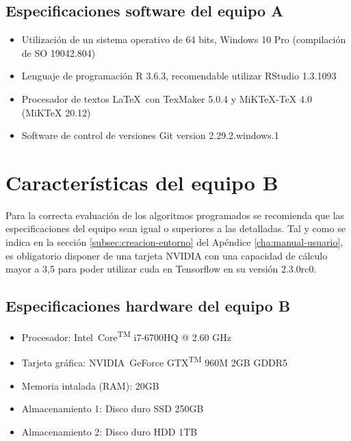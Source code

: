 \subsection{Especificaciones software del equipo A}
\label{subsec:especificaciones-software-equipoa}
\begin{itemize}
    \item Utilización de un sistema operativo de 64 bits, Windows 10 Pro (compilación de SO 19042.804)
    \item Lenguaje de programación R 3.6.3, recomendable utilizar RStudio 1.3.1093
    \item Procesador de textos \LaTeX\ con TexMaker 5.0.4 y MiKTeX-TeX 4.0 (MiKTeX 20.12)
    \item Software de control de versiones Git version 2.29.2.windows.1
\end{itemize}

\section{Características del equipo B}
\label{sec:caracteristicas-segun-equipob}

Para la correcta evaluación de los algoritmos programados se recomienda que las especificaciones del equipo sean igual o superiores a las detalladas. Tal y como se indica en la sección \ref{subsec:creacion-entorno} del Apéndice \ref{cha:manual-usuario}, es obligatorio disponer de una tarjeta NVIDIA con una capacidad de cálculo mayor a 3,5 para poder utilizar \gls{cuda} en Tensorflow en su versión 2.3.0rc0.

\subsection{Especificaciones hardware del equipo B}
\label{subsec:especificaciones-hardware-equipob}

\begin{itemize}
    \item Procesador: Intel\textregistered\ Core\textsuperscript{TM} i7-6700HQ @ 2.60 GHz
    \item Tarjeta gráfica: NVIDIA\textregistered\ GeForce GTX\textsuperscript{TM} 960M 2GB GDDR5
    \item Memoria intalada (RAM): 20GB
    \item Almacenamiento 1: Disco duro SSD 250GB
    \item Almacenamiento 2: Disco duro HDD 1TB
\end{itemize}

